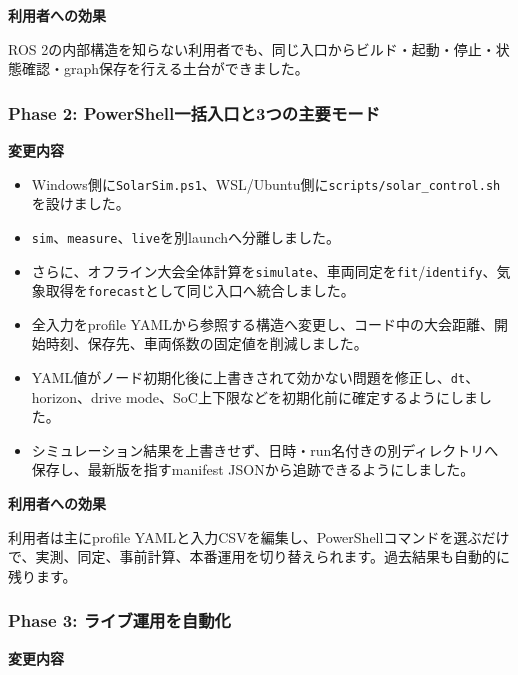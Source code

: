 \documentclass[
  japanese,
  a4paper,
  11pt]{article}
\providecommand{\tightlist}{%
  \setlength{\itemsep}{0pt}\setlength{\parskip}{0pt}}
\begin{document}
\textbf{利用者への効果}

ROS
2の内部構造を知らない利用者でも、同じ入口からビルド・起動・停止・状態確認・graph保存を行える土台ができました。

\subsubsection{Phase 2:
PowerShell一括入口と3つの主要モード}\label{phase-2-powershellux4e00ux62ecux5165ux53e3ux30683ux3064ux306eux4e3bux8981ux30e2ux30fcux30c9}

\textbf{変更内容}

\begin{itemize}
\tightlist
\item
  Windows側に\texttt{SolarSim.ps1}、WSL/Ubuntu側に\texttt{scripts/solar\_control.sh}を設けました。
\item
  \texttt{sim}、\texttt{measure}、\texttt{live}を別launchへ分離しました。
\item
  さらに、オフライン大会全体計算を\texttt{simulate}、車両同定を\texttt{fit}/\texttt{identify}、気象取得を\texttt{forecast}として同じ入口へ統合しました。
\item
  全入力をprofile
  YAMLから参照する構造へ変更し、コード中の大会距離、開始時刻、保存先、車両係数の固定値を削減しました。
\item
  YAML値がノード初期化後に上書きされて効かない問題を修正し、\texttt{dt}、horizon、drive
  mode、SoC上下限などを初期化前に確定するようにしました。
\item
  シミュレーション結果を上書きせず、日時・run名付きの別ディレクトリへ保存し、最新版を指すmanifest
  JSONから追跡できるようにしました。
\end{itemize}

\textbf{利用者への効果}

利用者は主にprofile
YAMLと入力CSVを編集し、PowerShellコマンドを選ぶだけで、実測、同定、事前計算、本番運用を切り替えられます。過去結果も自動的に残ります。

\subsubsection{Phase 3:
ライブ運用を自動化}\label{phase-3-ux30e9ux30a4ux30d6ux904bux7528ux3092ux81eaux52d5ux5316}

\textbf{変更内容}
\end{document}
